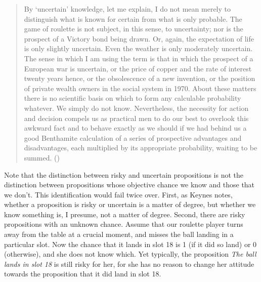 \documentclass[
  11pt,
  letterpaper,
  DIV=11,
  numbers=noendperiod,
  oneside]{scrartcl}
\begin{document}
\begin{quote}
By `uncertain' knowledge, let me explain, I do not mean merely to
distinguish what is known for certain from what is only probable. The
game of roulette is not subject, in this sense, to uncertainty; nor is
the prospect of a Victory bond being drawn. Or, again, the expectation
of life is only slightly uncertain. Even the weather is only moderately
uncertain. The sense in which I am using the term is that in which the
prospect of a European war is uncertain, or the price of copper and the
rate of interest twenty years hence, or the obsolescence of a new
invention, or the position of private wealth owners in the social system
in 1970. About these matters there is no scientific basis on which to
form any calculable probability whatever. We simply do not know.
Nevertheless, the necessity for action and decision compels us as
practical men to do our best to overlook this awkward fact and to behave
exactly as we should if we had behind us a good Benthamite calculation
of a series of prospective advantages and disadvantages, each multiplied
by its appropriate probability, waiting to be summed.
()
\end{quote}

Note that the distinction between risky and uncertain propositions is
not the distinction between propositions whose objective chance we know
and those that we don't. This identification would fail twice over.
First, as Keynes notes, whether a proposition is risky or uncertain is a
matter of degree, but whether we know something is, I presume, not a
matter of degree. Second, there are risky propositions with an unknown
chance. Assume that our roulette player turns away from the table at a
crucial moment, and misses the ball landing in a particular slot. Now
the chance that it lands in slot 18 is 1 (if it did so land) or 0
(otherwise), and she does not know which. Yet typically, the proposition
\emph{The ball lands in slot 18} is still risky for her, for she has no
reason to change her attitude towards the proposition that it did land
in slot 18.
\end{document}
